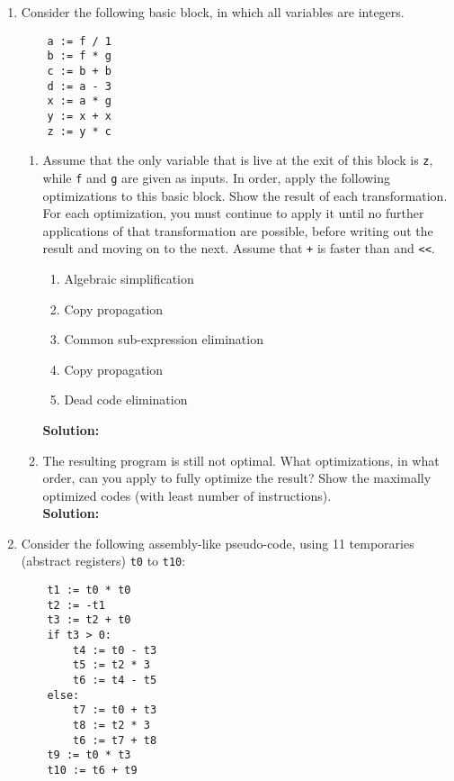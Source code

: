 \documentclass[11pt]{article}
\begin{document}
\begin{enumerate}
\begin{enumerate}
   \end{enumerate}
\newpage


  \item  Consider the following basic block, in which all variables are integers.
  
  \begin{lstlisting}
    a := f / 1
    b := f * g
    c := b + b
    d := a - 3
    x := a * g
    y := x + x
    z := y * c
  \end{lstlisting}

  \begin{enumerate}
  \item
  Assume that the only variable that is live at the exit of this block is {\tt z}, while {\tt f} and {\tt g} are given as inputs. In order, apply the following optimizations to this basic block. Show the result of each transformation. For each optimization, you must continue to apply it until no further applications of that transformation are possible, before writing out the result and moving on to the next.
  Assume that {\tt +} is faster than {\tt *} and {\tt <<}.
  
  \begin{enumerate}
    \item Algebraic simplification
    \item Copy propagation
    \item Common sub-expression elimination
    \item Copy propagation
    \item Dead code elimination
  \end{enumerate}

    \textbf{Solution:} 
    


\item
  The resulting program is still not optimal. What optimizations, in what order, can you apply to fully optimize the result? Show the maximally optimized codes (with least number of instructions).
  \\
    
    \textbf{Solution:} 
  \end{enumerate}
    
    
    \newpage

  \item  Consider the following assembly-like pseudo-code, using 11 temporaries (abstract registers) \texttt{t0} to \texttt{t10}: 
  
  \begin{lstlisting}
    t1 := t0 * t0
    t2 := -t1
    t3 := t2 + t0
    if t3 > 0:
        t4 := t0 - t3
        t5 := t2 * 3
        t6 := t4 - t5
    else:
        t7 := t0 + t3
        t8 := t2 * 3
        t6 := t7 + t8
    t9 := t0 * t3
    t10 := t6 + t9
  \end{lstlisting}


\end{enumerate}
\end{document}
